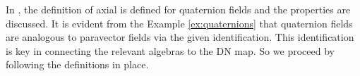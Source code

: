 In \cite{belishev_algebras_2017, belishev_algebras_2019}, the definition of axial is defined for quaternion fields and the properties are discussed.  It is evident from the Example \ref{ex:quaternions} that quaternion fields are analogous to paravector fields via the given identification.  This identification is key in connecting the relevant algebras to the DN map. So we proceed by following the definitions in place.  

